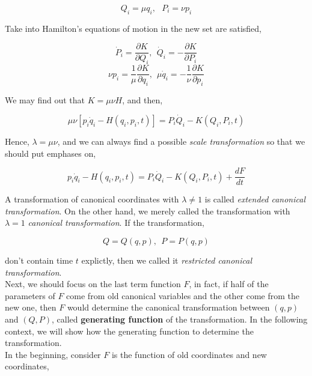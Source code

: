 \documentclass[12pt]{article}
\numberwithin{equation}{section}
\begin{document}
\begin{center}
    \[ Q_i = \mu q_i,\ \ \ P_i = \nu p_i \]
\end{center}

Take into Hamilton's equations of motion in the new set are satisfied,

\begin{center}
    \[ \dot{P}_i = \frac{\partial K}{\partial Q_i},\ \ \dot{Q}_i = - \frac{\partial K}{\partial P_i} \]
    \[ \nu p_i = \frac{1}{\mu} \frac{\partial K}{\partial q_i},\ \ \mu \dot{q}_i = -\frac{1}{\nu} \frac{\partial K}{\partial p_i} \]
\end{center}

We may find out that $K = \mu \nu H$, and then,

\begin{center}
    \[ \mu \nu \left[ p_i\dot{q}_i - H(q_i, p_i, t) \right] = P_i\dot{Q}_i - K(Q_i, P_i, t) \]
\end{center}

Hence, $\lambda = \mu \nu$, and we can always find a possible \textit{scale transformation} so that we should put emphases on,

\begin{center}
    \[ p_i\dot{q}_i - H(q_i, p_i, t) = P_i\dot{Q}_i - K(Q_i, P_i, t) + \frac{dF}{dt} \]
\end{center}

A transformation of canonical coordinates with $\lambda \ne 1$ is called \textit{extended canonical transformation}. On the other hand, we merely called the transformation with $\lambda = 1$ \textit{canonical transformation}. If the transformation, 

\begin{center}
    \[ Q = Q(q, p),\ \ P = P(q, p) \]
\end{center}

\noindent don't contain time $t$ explictly, then we called it \textit{restricted canonical transformation}.
\\
\indent Next, we should focus on the last term function $F$, in fact, if half of the parameters of $F$ come from old canonical variables and the other come from the new one, then $F$ would determine the canonical transformation between $(q, p)$ and $(Q, P)$, called \textbf{generating function} of the transformation. In the following context, we will show how the generating function to determine the transformation.
\\
\indent In the beginning, consider $F$ is the function of old coordinates and new coordinates,
\end{document}
